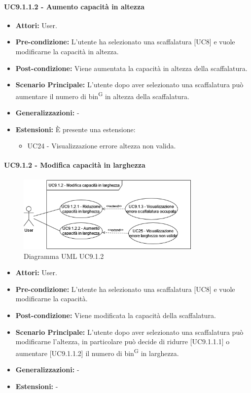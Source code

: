 \paragraph{UC9.1.1.2 - Aumento capacità in altezza}
\begin{itemize}
    \item \textbf{Attori:} User.
    \item \textbf{Pre-condizione:} L'utente ha selezionato una scaffalatura [UC8] e vuole modificarne la capacità in altezza.
    \item \textbf{Post-condizione:} Viene aumentata la capacità in altezza della scaffalatura.
    \item \textbf{Scenario Principale:} L'utente dopo aver selezionato una scaffalatura può aumentare il numero di bin\textsuperscript{G} in altezza della scaffalatura.
    \item \textbf{Generalizzazioni:} -
    \item \textbf{Estensioni:} È presente una estensione:
    \begin{itemize}
        \item UC24 - Visualizzazione errore altezza non valida.
    \end{itemize}
\end{itemize}


\paragraph{UC9.1.2 - Modifica capacità in larghezza}
\begin{figure}[H]
  \centering
  \includegraphics[width=0.8\textwidth]{UC_diagrams_1-10/UC9.1.2.drawio.png}
   \caption{Diagramma UML UC9.1.2}
\end{figure}
\begin{itemize}
    \item \textbf{Attori:} User.
    \item \textbf{Pre-condizione:} L'utente ha selezionato una scaffalatura [UC8] e vuole modificarne la capacità.
    \item \textbf{Post-condizione:} Viene modificata la capacità della scaffalatura.
    \item \textbf{Scenario Principale:} L'utente dopo aver selezionato una scaffalatura può modificarne l'altezza, in particolare può decide di ridurre [UC9.1.1.1] o aumentare [UC9.1.1.2] il numero di bin\textsuperscript{G} in larghezza.
    \item \textbf{Generalizzazioni:} -
    \item \textbf{Estensioni:} -
\end{itemize}


